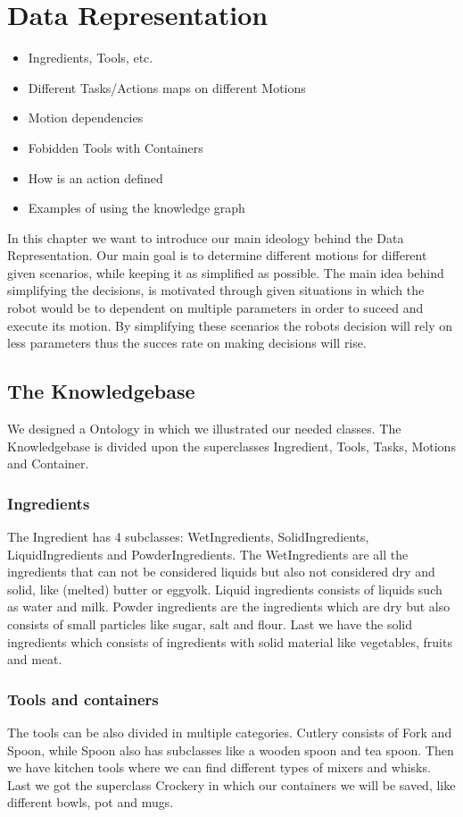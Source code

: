 \chapter*{Data Representation}
\begin{itemize}
    \item Ingredients, Tools, etc.
    \item Different Tasks/Actions maps on different Motions
    \item Motion dependencies
    \item Fobidden Tools with Containers
    \item How is an action defined
    \item Examples of using the knowledge graph
\end{itemize}

In this chapter we want to introduce our main ideology behind the Data Representation. Our main goal is to determine different motions for different given scenarios, while keeping it as simplified as possible.
The main idea behind simplifying the decisions, is motivated through given situations in which the robot would be to dependent on multiple parameters in order to suceed and execute its motion.
By simplifying these scenarios the robots decision will rely on less parameters thus the succes rate on making decisions will rise.

\section*{The Knowledgebase}
We designed a Ontology in which we illustrated our needed classes. 
The Knowledgebase is divided upon the superclasses Ingredient, Tools, Tasks, Motions and Container.
\subsection*{Ingredients}
The Ingredient has 4 subclasses: WetIngredients, SolidIngredients, LiquidIngredients and PowderIngredients.
The WetIngredients are all the ingredients that can not be considered liquids but also not considered dry and solid, like (melted) butter or eggyolk. 
Liquid ingredients consists of liquids such as water and milk. Powder ingredients are the ingredients which are dry but also consists of small particles like sugar, salt and flour.
Last we have the solid ingredients which consists of ingredients with solid material like vegetables, fruits and meat.

\subsection*{Tools and containers}
The tools can be also divided in multiple categories. Cutlery consists of Fork and Spoon, while Spoon also has subclasses like a wooden spoon and tea spoon.
Then we have kitchen tools where we can find different types of mixers and whisks. Last we got the superclass Crockery in which our containers we will be saved, like different bowls, pot and mugs.

